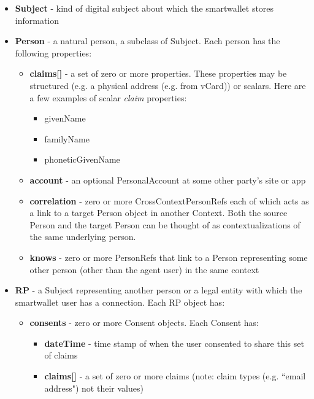 \documentclass[11pt, oneside]{article}   	%
\begin{document}
\begin{itemize}
\item \textbf{Subject} - kind of digital subject about which the smartwallet stores information
\item \textbf{Person} - a natural person, a subclass of Subject. Each person has the following properties:
	\begin{itemize}
	\item \textbf{claims[]} - a set of zero or more properties. These properties may be structured (e.g. a physical address (e.g. from vCard)) or scalars. Here are a few examples of scalar \emph{claim} properties: 
		\begin{itemize}
		\item givenName
		\item familyName
		\item phoneticGivenName
		\end{itemize}
	\item \textbf{account} - an optional PersonalAccount at some other party's site or app
	\item \textbf{correlation} - zero or more CrossContextPersonRefs each of which acts as a link to a target Person object in another Context. Both the source Person and the target Person can be thought of as contextualizations of the same underlying person.
	\item \textbf{knows} - zero or more PersonRefs that link to a Person representing some other person (other than the  agent user) in the same context
	\end{itemize}
\item \textbf{RP} - a Subject representing another person or a legal entity with which the smartwallet user has a connection. Each RP object has:
	\begin {itemize}
	\item \textbf{consents} - zero or more Consent objects. Each Consent has:
		\begin{itemize}
		\item \textbf{dateTime} - time stamp of when the user consented to share this set of claims
		\item \textbf{claims[]}  - a set of zero or more claims (note: claim types (e.g. ``email address") not their values)
		\end{itemize}
	\end{itemize}
\end{itemize}

\end{document}
